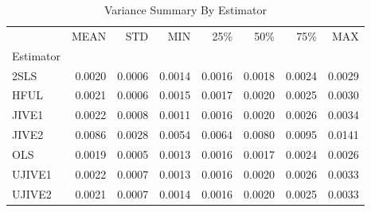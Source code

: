 \begin{table}[ht]
\centering
\caption{Variance Summary By Estimator}
\begin{tabular}{lrrrrrrr}
\toprule
 & MEAN & STD & MIN & 25\% & 50\% & 75\% & MAX \\
Estimator &  &  &  &  &  &  &  \\
\midrule
2SLS & 0.0020 & 0.0006 & 0.0014 & 0.0016 & 0.0018 & 0.0024 & 0.0029 \\
HFUL & 0.0021 & 0.0006 & 0.0015 & 0.0017 & 0.0020 & 0.0025 & 0.0030 \\
JIVE1 & 0.0022 & 0.0008 & 0.0011 & 0.0016 & 0.0020 & 0.0026 & 0.0034 \\
JIVE2 & 0.0086 & 0.0028 & 0.0054 & 0.0064 & 0.0080 & 0.0095 & 0.0141 \\
OLS & 0.0019 & 0.0005 & 0.0013 & 0.0016 & 0.0017 & 0.0024 & 0.0026 \\
UJIVE1 & 0.0022 & 0.0007 & 0.0013 & 0.0016 & 0.0020 & 0.0026 & 0.0033 \\
UJIVE2 & 0.0021 & 0.0007 & 0.0014 & 0.0016 & 0.0020 & 0.0025 & 0.0033 \\
\bottomrule
\end{tabular}
\end{table}
